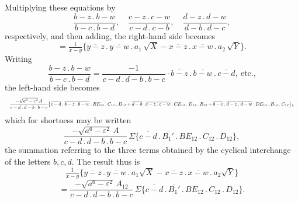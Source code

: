 \documentclass[11pt]{article}
\begin{document}
Multiplying these equations by
\[
\frac{b-z\mathbin{.}b-w}{b-c\mathbin{.}b-d},\quad \frac{c-z\mathbin{.}c-w}{c-d\mathbin{.}c-b},\quad \frac{d-z\mathbin{.}d-w}{d-b\mathbin{.}d-c},
\]
respectively, and then adding, the right-hand side becomes
\[
= \tfrac{1}{x-y}\bigl\{\overline{y-z}\mathbin{.}\overline{y-w}\mathbin{.}a_1\,\sqrt{X} - \overline{x-z}\mathbin{.}\overline{x-w}\mathbin{.}a_2\,\sqrt{Y}\bigr\}.
\]
Writing
\[
\frac{b-z\mathbin{.}b-w}{b-c\mathbin{.}b-d} = \frac{-1}{c-d\mathbin{.}d-b\mathbin{.}b-c}\cdot \overline{b-z}\mathbin{.}\overline{b-w}\mathbin{.}\overline{c-d},\ \text{etc.,}
\]
the left-hand side becomes
\[
\resizebox{\textwidth}{!}{$\displaystyle \frac{-\sqrt{a^6-\varepsilon^2}\, A}{c-d\mathbin{.}d-b\mathbin{.}b-c}\bigl\{\overline{c-d}\mathbin{.}\overline{b-z\mathbin{.}b-w}\mathbin{.}BE_{12}\mathbin{.}C_{12}\mathbin{.}D_{12} + \overline{d-b}\mathbin{.}\overline{c-z\mathbin{.}c-w}\mathbin{.}CE_{12}\mathbin{.}D_{12}\mathbin{.}B_{12} + \overline{b-c}\mathbin{.}\overline{d-z\mathbin{.}d-w}\mathbin{.}DE_{12}\mathbin{.}B_{12}\mathbin{.}C_{12}\bigr\}$},
\]
which for shortness may be written
\[
\frac{-\sqrt{a^6-\varepsilon^2}\, A}{c-d\mathbin{.}d-b\mathbin{.}b-c}\, \Sigma\bigl\{\overline{c-d}\mathbin{.}\overline{B_1'}\mathbin{.}BE_{12}\mathbin{.}C_{12}\mathbin{.}D_{12}\bigr\},
\]
the summation referring to the three terms obtained by the cyclical interchange of the letters $b,c,d$. The result thus is
\[
\tfrac{1}{x-y}\bigl\{\overline{y-z}\mathbin{.}\overline{y-w}\mathbin{.}a_1\sqrt{X} - \overline{x-z}\mathbin{.}\overline{x-w}\mathbin{.}a_2\sqrt{Y}\bigr\}
\]
\[
= \frac{-\sqrt{a^6-\varepsilon^2}\, A_{12}}{c-d\mathbin{.}d-b\mathbin{.}b-c}\,\Sigma\bigl\{\overline{c-d}\mathbin{.}\overline{B_1'}\mathbin{.}BE_{12}\mathbin{.}C_{12}\mathbin{.}D_{12}\bigr\}.
\]
\end{document}
